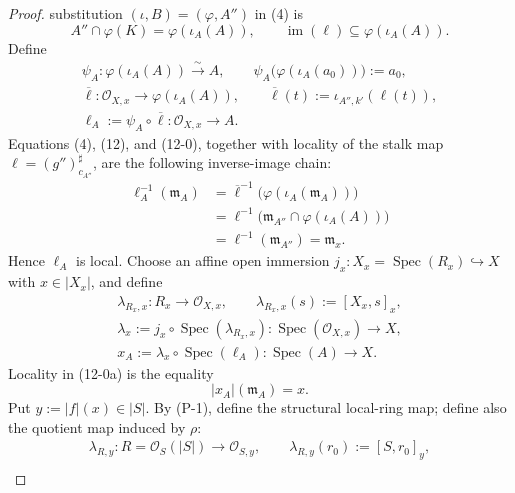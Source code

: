 \begin{proof}
  substitution $(\iota,B)=(\varphi,A'')$ in (4) is
  \[
    A''\cap\varphi(K)=\varphi(\iota_A(A)),
    \qquad
    \operatorname{im}(\ell)\subseteq\varphi(\iota_A(A)).       \tag{12}
  \]
  Define
  \[
  \begin{gathered}
    \psi_A\colon\varphi(\iota_A(A))\xrightarrow{\sim}A,
    \qquad \psi_A\bigl(\varphi(\iota_A(a_0))\bigr):=a_0,\\
    \overline\ell\colon\mathcal O_{X,x}\longrightarrow
      \varphi(\iota_A(A)),
    \qquad \overline\ell(t):=\iota_{A'',k'}(\ell(t)),\\
    \ell_A:=\psi_A\circ\overline\ell
      \colon\mathcal O_{X,x}\longrightarrow A.
  \end{gathered}                                                   \tag{12-0}
  \]
  Equations (4), (12), and (12-0), together with locality of the stalk map
  $\ell=(g'')_{c_{A''}}^\sharp$, are the following inverse-image chain:
  \[
  \begin{aligned}
    \ell_A^{-1}(\mathfrak m_A)
      &=\overline\ell^{-1}
          \bigl(\varphi(\iota_A(\mathfrak m_A))\bigr)\\
      &=\ell^{-1}
          \bigl(\mathfrak m_{A''}\cap\varphi(\iota_A(A))\bigr)\\
      &=\ell^{-1}(\mathfrak m_{A''})
       =\mathfrak m_x.
  \end{aligned}                                                    \tag{12-0a}
  \]
  Hence $\ell_A$ is local.  Choose an affine open immersion
  $j_x\colon X_x=\operatorname{Spec}(R_x)\hookrightarrow X$ with $x\in|X_x|$,
  and define
  \[
  \begin{gathered}
    \lambda_{R_x,x}\colon R_x\longrightarrow\mathcal O_{X,x},
    \qquad \lambda_{R_x,x}(s):=[X_x,s]_x,\\
    \lambda_x:=j_x\circ\operatorname{Spec}(\lambda_{R_x,x})
      \colon\operatorname{Spec}(\mathcal O_{X,x})\to X,\\
    x_A:=\lambda_x\circ\operatorname{Spec}(\ell_A)
      \colon\operatorname{Spec}(A)\to X.
  \end{gathered}                                                   \tag{12-0b}
  \]
  Locality in (12-0a) is the equality
  \[
    |x_A|(\mathfrak m_A)=x.
  \]
  Put $y:=|f|(x)\in|S|$.  By (P-1), define the structural local-ring map;
  define also the quotient map induced by $\rho$:
  \[
  \begin{gathered}
    \lambda_{R,y}\colon R=\mathcal O_S(|S|)\longrightarrow
      \mathcal O_{S,y},
    \qquad \lambda_{R,y}(r_0):=[S,r_0]_y,\\

\end{gathered}\]
\end{proof}
